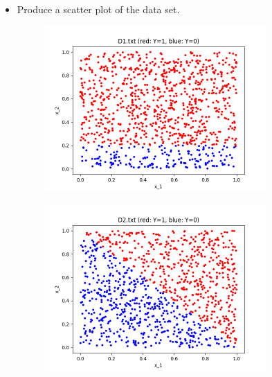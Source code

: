 \documentclass[a4paper]{article}
\theoremstyle{definition}
\newenvironment{soln}{
    \leavevmode\color{blue}\ignorespaces
}{}
\begin{document}
\begin{enumerate}
\begin{itemize}
  \item Produce a scatter plot of the data set.
  \begin{soln}
    \begin{figure}[h!]
        \centering
        \includegraphics[width=0.8\textwidth]{images/D1Scatter.png}  
        \captionsetup{labelformat=empty}
        \caption{}
        \label{fig:mixed}
    \end{figure}
    \begin{figure}[h!]
        \centering
        \includegraphics[width=0.8\textwidth]{images/D2Scatter.png}  
        \captionsetup{labelformat=empty}
        \caption{}
        \label{fig:mixed}
    \end{figure}
  \end{soln}


\end{itemize}
\end{enumerate}
\end{document}
